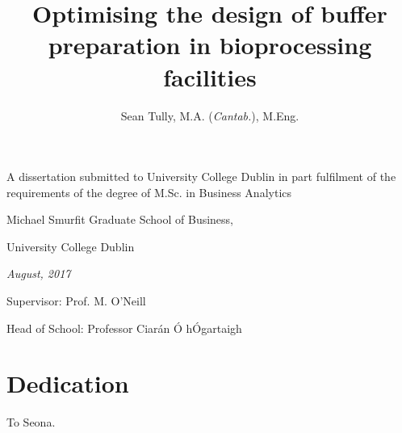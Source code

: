 \documentclass[a4paper,12pt,bibtotoc,oneside]{book} %
\numberwithin{equation}{section}
\numberwithin{figure}{chapter}
\begin{document}
\frontmatter 

\title
{Optimising the design of buffer preparation in bioprocessing facilities}

\author{Sean Tully, M.A. (\emph{Cantab.}), M.Eng.}

\maketitle

{\normalsize 
\vfill
\begin{center} 
\textup{A dissertation submitted to University College Dublin in part
fulfilment of the requirements of the degree of M.Sc. in Business Analytics}
\end{center}
\vfill
\begin{center} 
Michael Smurfit Graduate School of Business,
\end{center}
\begin{center} 
University College Dublin
\end{center}
\vfill
\begin{center} 
\textit{August, 2017}
\end{center}
\vfill
\begin{center} 
\textup{Supervisor: Prof. M. O'Neill}
\end{center}
\vfill
\begin{center} 
\textup{Head of School: Professor Ciar\'an \'O h\'Ogartaigh}
\end{center}
\vfill
}

\thispagestyle{empty}

\clearpage

\chapter*{Dedication} 
To Seona.


\cleardoublepage
\tableofcontents
\clearpage

\listoffigures{}
\clearpage

\listoftables{}




\end{document}
